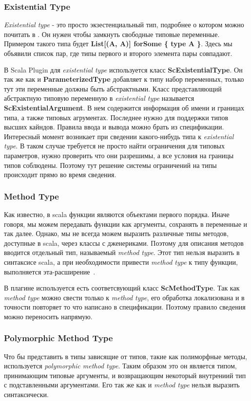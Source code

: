 \subsubsection{Existential Type}
\textit{Existential type} - это просто экзестенциальный тип, подробнее о котором
можно почитать в \cite{type_theory}.
Он нужен чтобы замкнуть свободные типовые переменные.
Примером такого типа будет \textbf{List[(A, A)] forSome \{ type A \}}.
Здесь мы объявили список пар, где типы первого и второго элемента пары совпадают.

В Scala Plugin для \textit{existential type} используется класс
\textbf{ScExistentialType}.
Он так же как и \textbf{ParameterizedType} добавляет к типу набор переменных,
только тут эти переменные должны быть абстрактными.
Класс представляющий абстрактную типовую переменную в \textit{existential type}
называется \textbf{ScExistentialArgument}.
В нем содержится информация об имени и границах типа, а также типовых агрументах.
Последнее нужно для поддержки типов высших кайндов.
Правила ввода и вывода можно брать из спецификации.
Интересный момент возникает при сведении какого-нибудь типа к \textit{existential type}.
В таком случае требуется не просто найти ограничения для типовых параметров,
нужно проверить что они разрешимы, а все условия на границы типов соблюдены.
Поэтому тут решение системы ограничений на типы происходит прямо во время сведения.

\subsubsection{Method Type}

Как известно, в scala функции являются объектами первого порядка.
Иначе говоря, мы можем передавать функции как аргументы, сохранять в переменные
и так далее.
Однако, мы не всегда можем выразить различные типы методов, доступные в scala,
через классы с дженериками.
Поэтому для описания методов вводится отдельный тип, называемый \textit{method type}.
Этот тип нельзя выразить в синтаксисе scala, а при необходимости привести
\textit{method type} к типу функции, выполняется эта-расширение~\cite{eta_expansion}.

В плагине используется есть соответсвующий класс \textbf{ScMethodType}.
Так как \textit{method type} можно свести только к \textit{method type}, его
обработка локализована и в точности повторяет то что написано в спецификации.
Поэтому правило сведения можно переносить напрямую.

\subsubsection{Polymorphic Method Type}
Что бы представить в типы зависящие от типов, такие как полиморфные методы,
используется \textit{polymorphic method type}.
Таким образом это он является типом, принимающим типовые аргументы,
и возвращающим некоторый внутрениий тип с подставленными аргументами.
Его так же как и \textit{method type} нельзя выразить синтаксически.

